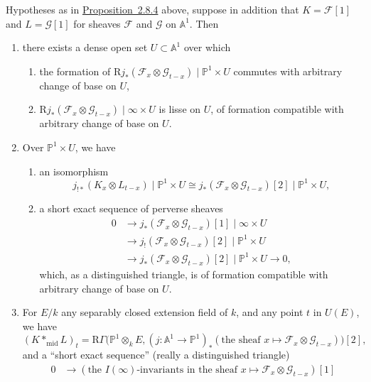Hypotheses as in \hyperref[prop:2.8.4]{Proposition~2.8.4} above, suppose in addition that
\(K=\mathcal{F}[1]\) and \(L=\mathcal{G}[1]\) for sheaves \(\mathcal{F}\) and
\(\mathcal{G}\) on \(\mathbb{A}^1\). Then
\begin{enumerate}[label=(\arabic*)]
\item there exists a dense open set \(U\subset\mathbb{A}^1\) over which
\begin{enumerate}[label=(\alph*)]
\item the formation of
\(\mathrm{R}j_*(\mathcal{F}_x\otimes\mathcal{G}_{t-x})\mid
\mathbb{P}^1\times U\) commutes with arbitrary change of base on \(U\),
\item \(\mathrm{R}j_*(\mathcal{F}_x\otimes\mathcal{G}_{t-x})\mid
\infty\times U\) is lisse on \(U\), of formation compatible with arbitrary
change of base on \(U\).
\end{enumerate}
\item Over \(\mathbb{P}^1\times U\), we have
\begin{enumerate}[label=(\alph*)]
\item an isomorphism
\[
  j_{!*}(K_x\otimes L_{t-x})\mid\mathbb{P}^1\times U
  \cong
  j_*(\mathcal{F}_x\otimes\mathcal{G}_{t-x})[2]
  \mid\mathbb{P}^1\times U,
\]
\item a short exact sequence of perverse sheaves
\[
  \begin{aligned}
    0 &\to
    j_*(\mathcal{F}_x\otimes\mathcal{G}_{t-x})[1]\mid\infty\times U\\
    &\to
    j_!(\mathcal{F}_x\otimes\mathcal{G}_{t-x})[2]
    \mid\mathbb{P}^1\times U\\
    &\to
    j_*(\mathcal{F}_x\otimes\mathcal{G}_{t-x})[2]
    \mid\mathbb{P}^1\times U
    \to 0,
  \end{aligned}
\]
which, as a distinguished triangle, is of formation compatible with arbitrary
change of base on \(U\).
\end{enumerate}
\item For \(E/k\) any separably closed extension field of \(k\), and any point
\(t\) in \(U(E)\), we have
\[
  (K*_{\mathrm{mid}}L)_t
  =
  \mathrm{R}\Gamma\bigl(\mathbb{P}^1\otimes_k E,
  (j:\mathbb{A}^1\to\mathbb{P}^1)_*
  (\text{the sheaf }x\mapsto\mathcal{F}_x\otimes\mathcal{G}_{t-x})\bigr)[2],
\]
and a ``short exact sequence'' (really a distinguished triangle)
\[
  \begin{aligned}
    0 &\to
    (\text{the }I(\infty)\text{-invariants in the sheaf }
    x\mapsto \mathcal{F}_x\otimes\mathcal{G}_{t-x})[1]\\

\end{aligned}\]
\end{enumerate}
